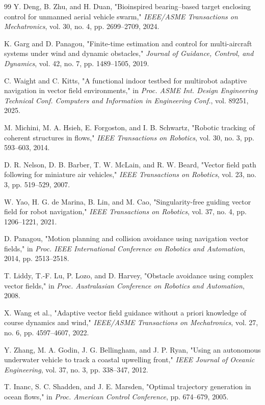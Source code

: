 \documentclass[lettersize,journal]{IEEEtran}
\begin{document}
\begin{thebibliography}{99}
 Y. Deng, B. Zhu, and H. Duan, "Bioinspired bearing–based target enclosing control for unmanned aerial vehicle swarm," \textit{IEEE/ASME Transactions on Mechatronics}, vol. 30, no. 4, pp. 2699--2709, 2024.

 K. Garg and D. Panagou, "Finite-time estimation and control for multi-aircraft systems under wind and dynamic obstacles," \textit{Journal of Guidance, Control, and Dynamics}, vol. 42, no. 7, pp. 1489--1505, 2019.

 C. Waight and C. Kitts, "A functional indoor testbed for multirobot adaptive navigation in vector field environments," in \textit{Proc. ASME Int. Design Engineering Technical Conf. Computers and Information in Engineering Conf.}, vol. 89251, 2025.

 M. Michini, M. A. Hsieh, E. Forgoston, and I. B. Schwartz, "Robotic tracking of coherent structures in flows," \textit{IEEE Transactions on Robotics}, vol. 30, no. 3, pp. 593--603, 2014.

 D. R. Nelson, D. B. Barber, T. W. McLain, and R. W. Beard, "Vector field path following for miniature air vehicles," \textit{IEEE Transactions on Robotics}, vol. 23, no. 3, pp. 519--529, 2007.

 W. Yao, H. G. de Marina, B. Lin, and M. Cao, "Singularity-free guiding vector field for robot navigation," \textit{IEEE Transactions on Robotics}, vol. 37, no. 4, pp. 1206--1221, 2021.

 D. Panagou, "Motion planning and collision avoidance using navigation vector fields," in \textit{Proc. IEEE International Conference on Robotics and Automation}, 2014, pp. 2513--2518.

 T. Liddy, T.-F. Lu, P. Lozo, and D. Harvey, "Obstacle avoidance using complex vector fields," in \textit{Proc. Australasian Conference on Robotics and Automation}, 2008.

 X. Wang et al., "Adaptive vector field guidance without a priori knowledge of course dynamics and wind," \textit{IEEE/ASME Transactions on Mechatronics}, vol. 27, no. 6, pp. 4597--4607, 2022.

 Y. Zhang, M. A. Godin, J. G. Bellingham, and J. P. Ryan, "Using an autonomous underwater vehicle to track a coastal upwelling front," \textit{IEEE Journal of Oceanic Engineering}, vol. 37, no. 3, pp. 338--347, 2012.

 T. Inanc, S. C. Shadden, and J. E. Marsden, "Optimal trajectory generation in ocean flows," in \textit{Proc. American Control Conference}, pp. 674--679, 2005.


\end{thebibliography}
\end{document}
